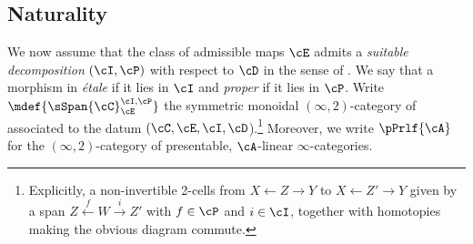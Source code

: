\subsection{Naturality}

We now assume that the class of admissible maps $\cE$ admits a \emph{suitable decomposition}
$(\cI,\cP)$ with respect to $\cD$ in the sense of \cite[Definition A.5.9]{Mann2022}. We say that a morphism in \emph{\'etale} if it lies in $\cI$
and \emph{proper} if it lies in $\cP$.
Write $\mdef{\sSpan{\cC}_{\cE}^{\cI,\cP}}$ the
symmetric monoidal $(\infty,2)$-category of 
\cite[Definition 4.10]{Cnossen_Lenz_Linskens2026} associated to the datum
$(\cC,\cE,\cI,\cD$).\footnote{Explicitly, a non-invertible 2-cells from $X\leftarrow Z\to Y$ to  $X\leftarrow Z'\to Y$ given by a span $Z \xleftarrow{f} W\xrightarrow{i}Z'$ with $f\in \cP$ and $i\in \cI$, together with 
 homotopies making the obvious diagram commute.}
 Moreover, 
 we write $\pPrlf{\cA}$ for the $(\infty,2)$-category of presentable,
 $\cA$-linear $\infty$-categories.

